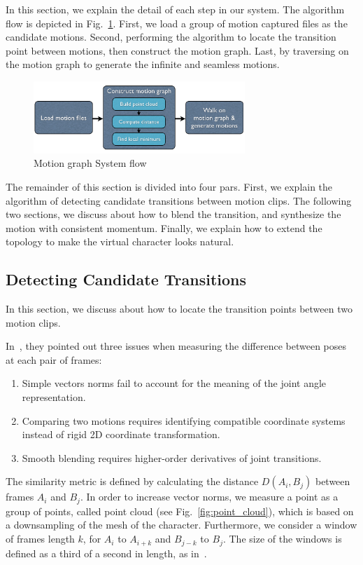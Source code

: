 In this section, we explain the detail of each step in our system. The algorithm 
flow is depicted in Fig.~\ref{fig:system_flow}. First, we load a group of motion 
captured files as the candidate motions. Second, performing the algorithm to 
locate the transition point between motions, then construct the motion graph.
Last, by traversing on the motion graph to generate the infinite and seamless 
motions.

\begin{figure}
\centering
\includegraphics [width=80mm] {Images/flow} 
\caption{Motion graph System flow}
\label{fig:system_flow}
\end{figure}

The remainder of this section is divided into four pars. 
First, we explain the algorithm of detecting candidate transitions between 
motion clips. The following two sections, we discuss about how to blend the 
transition, and synthesize the motion with consistent momentum.
Finally, we explain how to extend the topology to make the virtual character 
looks natural.

\subsection{Detecting Candidate Transitions}
In this section, we discuss about how to locate the transition points between two 
motion clips. 

In~\cite{kovar2002}, they pointed out three issues when measuring the difference between poses at each pair of 
frames: 
\begin{enumerate}
\item Simple vectors norms fail to account for the meaning of the joint angle 
representation.
\item Comparing two motions requires identifying compatible coordinate systems 
instead of rigid 2D coordinate transformation.
\item Smooth blending requires higher-order derivatives of joint transitions.
\end{enumerate}


The similarity metric is defined by calculating the distance $D(A_i,B_j)$ 
between frames $A_i$ and $B_j$. In order to increase vector norms, we measure a 
point as a group of points, called point cloud (see Fig.~\ref{fig:point_cloud}), which is  based on a 
downsampling of the mesh of the character. 
Furthermore, we consider a window of frames length $k$, for $A_i$ to $A_{i+k}$ and $B_{j-k}$ to 
$B_j$. The size of the windows is defined as a third of a second in length, as in~\cite{datadriven}. 

